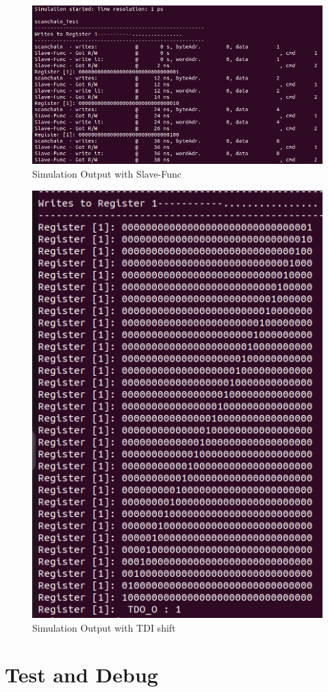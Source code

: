 \documentclass[a4paper,12pt,english]{report}
\begin{document}
\begin{enumerate}
\begin{figure}[h!]
  \centering
  \includegraphics[width=0.7\linewidth]{Writing to reg.png}
  \caption{Simulation Output with Slave-Func}
  \label{fig:sim}
\end{figure}


\begin{figure}[h!]
  \centering
  \includegraphics[width=0.7\linewidth]{reg out.png}
  \caption{Simulation Output with TDI shift}
  \label{fig:tdi-shift}
\end{figure}

\chapter{Test and Debug}

\end{enumerate}
\end{document}
